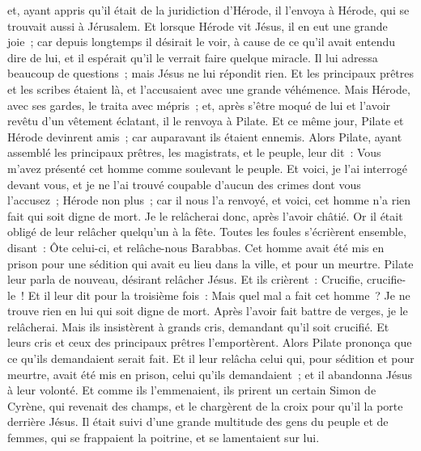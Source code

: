 \begin{multicols}{2}
et, ayant appris qu'il était de la juridiction d'Hérode, il l'envoya à Hérode, qui se trouvait aussi à Jérusalem.
Et lorsque Hérode vit Jésus, il en eut une grande joie~; car depuis longtemps il désirait le voir, à cause de ce qu'il avait entendu dire de lui, et il espérait qu'il le verrait faire quelque miracle.
Il lui adressa beaucoup de questions~; mais Jésus ne lui répondit rien.
Et les principaux prêtres et les scribes étaient là, et l'accusaient avec une grande véhémence.
Mais Hérode, avec ses gardes, le traita avec mépris~; et, après s'être moqué de lui et l'avoir revêtu d'un vêtement éclatant, il le renvoya à Pilate.
Et ce même jour, Pilate et Hérode devinrent amis~; car auparavant ils étaient ennemis.
Alors Pilate, ayant assemblé les principaux prêtres, les magistrats, et le peuple, leur dit~:
Vous m'avez présenté cet homme comme soulevant le peuple. Et voici, je l'ai interrogé devant vous, et je ne l'ai trouvé coupable d'aucun des crimes dont vous l'accusez~;
Hérode non plus~; car il nous l'a renvoyé, et voici, cet homme n'a rien fait qui soit digne de mort.
Je le relâcherai donc, après l'avoir châtié.
Or il était obligé de leur relâcher quelqu'un à la fête.
Toutes les foules s'écrièrent ensemble, disant~: Ôte celui-ci, et relâche-nous Barabbas.
Cet homme avait été mis en prison pour une sédition qui avait eu lieu dans la ville, et pour un meurtre.
Pilate leur parla de nouveau, désirant relâcher Jésus.
Et ils crièrent~: Crucifie, crucifie-le~!
Et il leur dit pour la troisième fois~: Mais quel mal a fait cet homme~? Je ne trouve rien en lui qui soit digne de mort. Après l'avoir fait battre de verges, je le relâcherai.
Mais ils insistèrent à grands cris, demandant qu'il soit crucifié. Et leurs cris et ceux des principaux prêtres l'emportèrent.
Alors Pilate prononça que ce qu'ils demandaient serait fait.
Et il leur relâcha celui qui, pour sédition et pour meurtre, avait été mis en prison, celui qu'ils demandaient~; et il abandonna Jésus à leur volonté.
Et comme ils l'emmenaient, ils prirent un certain Simon de Cyrène, qui revenait des champs, et le chargèrent de la croix pour qu'il la porte derrière Jésus.
Il était suivi d'une grande multitude des gens du peuple et de femmes, qui se frappaient la poitrine, et se lamentaient sur lui.

\end{multicols}
